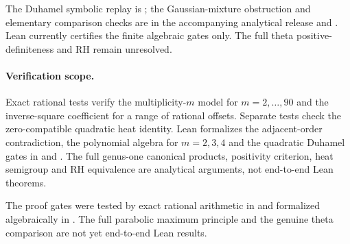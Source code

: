 The Duhamel symbolic replay is
;
the Gaussian-mixture obstruction
and elementary comparison checks are
in the accompanying analytical
release and
.
Lean currently certifies the
finite algebraic gates only.
The full theta positive-definiteness
and RH remain unresolved.

\paragraph{Verification scope.}
Exact rational tests verify the
multiplicity-$m$ model for
$m=2,\ldots,90$ and the
inverse-square coefficient
for a range of rational offsets.
Separate tests check the
zero-compatible quadratic heat
identity. Lean formalizes the
adjacent-order contradiction,
the polynomial algebra for
$m=2,3,4$ and the quadratic
Duhamel gates in
and
.
The full genus-one canonical
products, positivity criterion,
heat semigroup and RH equivalence
are analytical arguments, not
end-to-end Lean theorems.

The proof gates were tested by
exact rational arithmetic in
and formalized algebraically in
.
The full parabolic maximum principle
and the genuine theta comparison are
not yet end-to-end Lean results.
















